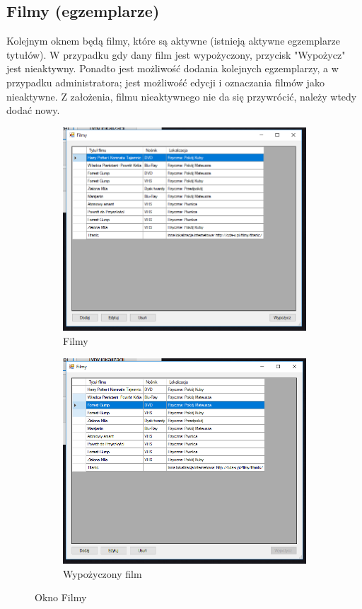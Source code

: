 \documentclass{article}
\begin{document}
\subsection{Filmy (egzemplarze)}
Kolejnym oknem będą filmy, które są aktywne (istnieją aktywne egzemplarze tytułów). W przypadku gdy dany film jest wypożyczony, przycisk "Wypożycz" jest nieaktywny. Ponadto jest możliwość dodania kolejnych egzemplarzy, a w przypadku administratora; jest możliwość edycji i oznaczania filmów jako nieaktywne. Z założenia, filmu nieaktywnego nie da się przywrócić, należy wtedy dodać nowy. 
\begin{figure}[!ht]
\centering
  \begin{subfigure}[b]{0.45\textwidth}
  \includegraphics[width=\textwidth]{films.PNG}
  \caption{Filmy}
  \end{subfigure}
  \begin{subfigure}[b]{0.45\textwidth}
  \includegraphics[width=\textwidth]{borrowed.PNG}
  \caption{Wypożyczony film}
  \end{subfigure}
  \caption{Okno Filmy}
\end{figure}
\end{document}
